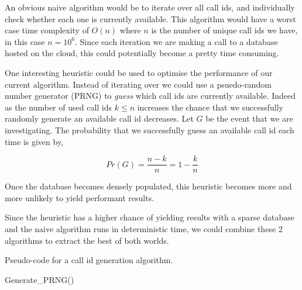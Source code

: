 An obvious naive algorithm would be to iterate over all call
ids, and individually check whether each one is currently
available. This algorithm would have a worst case time
complexity of $O(n)$ where $n$ is the number of unique call 
ids we have, in this case $n = 10^6$. Since each iteration we
are making a call to a database hosted on the cloud, this
could potentially become a pretty time consuming. 
\\ \vspace{0.2cm}

One interesting heuristic could be used to optimise the 
performance of our current algorithm. Instead of iterating 
over we could use a psuedo-random number generator (PRNG) to 
\textit{guess} which call ids are currently available. Indeed
as the number of used call ids $k \leq n$ increases the chance
that we successfully randomly generate an available call id
decreases. Let $G$ be the event that we are investigating.
The probability that we successfully guess an available call
id each time is given by, 

$$
  Pr(G) = \frac{n-k}{n} = 1 - \frac{k}{n}
$$

Once the database becomes densely populated, this heuristic 
becomes more and more unlikely to yield performant results. 
\\ \vspace{0.2cm}

Since the heuristic has a higher chance of yielding results 
with a sparse database and the naive algorithm runs in 
deterministic time, we could combine these 2 algorithms to 
extract the best of both worlds. \\ \vspace{0.2cm}

\begin{algorithm}[H]
\caption{Pseudo-code for a call id generation algorithm.}
\sffamily

\begin{algorithmic}[1]

    \State{}

      Generate\_PRNG()
    \EndIf

    \State{}


  \EndFunction
\end{algorithmic}
\end{algorithm}

